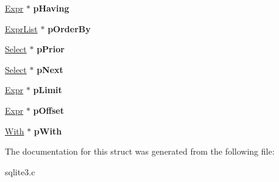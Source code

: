 \begin{DoxyCompactItemize}
\item 
\hyperlink{structExpr}{Expr} $\ast$ {\bfseries p\+Having}\hypertarget{structSelect_ad09e0b115e6e1599e3075b87dfa6e66e}{}\label{structSelect_ad09e0b115e6e1599e3075b87dfa6e66e}

\item 
\hyperlink{structExprList}{Expr\+List} $\ast$ {\bfseries p\+Order\+By}\hypertarget{structSelect_a73c474cd4a9a9b9aa4e3187d8bf2d886}{}\label{structSelect_a73c474cd4a9a9b9aa4e3187d8bf2d886}

\item 
\hyperlink{structSelect}{Select} $\ast$ {\bfseries p\+Prior}\hypertarget{structSelect_a51d1a253b0aba5a54b11b3bf3896d056}{}\label{structSelect_a51d1a253b0aba5a54b11b3bf3896d056}

\item 
\hyperlink{structSelect}{Select} $\ast$ {\bfseries p\+Next}\hypertarget{structSelect_a96aa0caf60390b8f5e88589639205c40}{}\label{structSelect_a96aa0caf60390b8f5e88589639205c40}

\item 
\hyperlink{structExpr}{Expr} $\ast$ {\bfseries p\+Limit}\hypertarget{structSelect_a11d3b48d04d58be818cdefb10aa061a0}{}\label{structSelect_a11d3b48d04d58be818cdefb10aa061a0}

\item 
\hyperlink{structExpr}{Expr} $\ast$ {\bfseries p\+Offset}\hypertarget{structSelect_aeaf016a10203b911000354122562fb46}{}\label{structSelect_aeaf016a10203b911000354122562fb46}

\item 
\hyperlink{structWith}{With} $\ast$ {\bfseries p\+With}\hypertarget{structSelect_a3ab5597bdc6b219ea03a6aca93260e9f}{}\label{structSelect_a3ab5597bdc6b219ea03a6aca93260e9f}

\end{DoxyCompactItemize}


The documentation for this struct was generated from the following file\+:\begin{DoxyCompactItemize}
\item 
sqlite3.\+c\end{DoxyCompactItemize}
